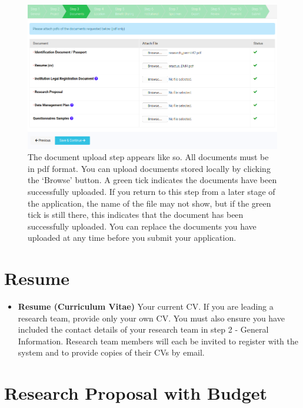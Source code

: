\documentclass[
]{book}
\providecommand{\tightlist}{%
  \setlength{\itemsep}{0pt}\setlength{\parskip}{0pt}}
\begin{document}
\begin{figure}
\centering
\includegraphics{images/documents.png}
\caption{The document upload step appears like so. All documents must be in pdf format. You can upload documents stored locally by clicking the `Browse' button. A green tick indicates the documents have been successfully uploaded. If you return to this step from a later stage of the application, the name of the file may not show, but if the green tick is still there, this indicates that the document has been successfully uploaded. You can replace the documents you have uploaded at any time before you submit your application.}
\end{figure}

\hypertarget{resume}{%
\section{Resume}\label{resume}}

\begin{itemize}
\tightlist
\item
  \textbf{Resume (Curriculum Vitae)} Your current CV. If you are leading a research team, provide only your own CV. You must also ensure you have included the contact details of your research team in step 2 - General Information. Research team members will each be invited to register with the system and to provide copies of their CVs by email.
\end{itemize}

\hypertarget{research-proposal-with-budget}{%
\section{Research Proposal with Budget}\label{research-proposal-with-budget}}
\end{document}

